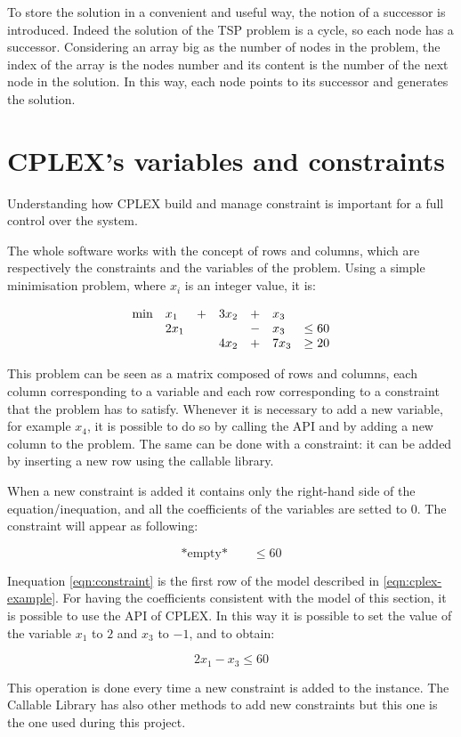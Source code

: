 To store the solution in a convenient and useful way, the notion of a successor is introduced. Indeed the solution of the TSP problem is a cycle, so each node has a successor. Considering an array big as the number of nodes in the problem, the index of the array is the nodes number and its content is the number of the next node in the solution. In this way, each node points to its successor and generates the solution.

\section{CPLEX's variables and constraints}
Understanding how CPLEX build and manage constraint is important for a full control over the system. 

The whole software works with the concept of rows and columns, which are respectively the constraints and the variables of the problem. Using a simple minimisation problem, where $x_i$ is an integer value, it is:

\begin{equation}
\label{eqn:cplex-example}
\begin{array}{lllllll}%
\text{min}  &x_1 	&+ 	& 3x_2 &+ & x_3\\
&  2x_1 &  	&   &- &x_3 &\le 60\\
&		&	& 4x_2 & + &7x_3 &\ge 20\\
\end{array}\\
\end{equation}

This problem can be seen as a matrix composed of rows and columns, each column corresponding to a variable and each row corresponding to a constraint that the problem has to satisfy. Whenever it is necessary to add a new variable, for example $x_4$, it is possible to do so by calling the API and by adding a new column to the problem. The same can be done with a constraint: it can be added by inserting a new row using the callable library.

When a new constraint is added it contains only the right-hand side of the equation/inequation, and all the coefficients of the variables are setted to 0. The constraint will appear as following:

\begin{equation}
\label{eqn:constraint}
\text{*empty*} \qquad \le 60
\end{equation}

Inequation \ref{eqn:constraint} is the first row of the model described in \ref{eqn:cplex-example}.
For having the coefficients consistent with the model of this section, it is possible to use the API of CPLEX. In this way it is possible to set the value of the variable $x_1$ to $2$ and $x_3$ to $-1$, and to obtain: 

\begin{equation}
\label{eqn:full-constraint}
2x_1-x_3 \le 60
\end{equation}

This operation is done every time a new constraint is added to the instance.
The Callable Library has also other methods to add new constraints but this one is the one used during this project.